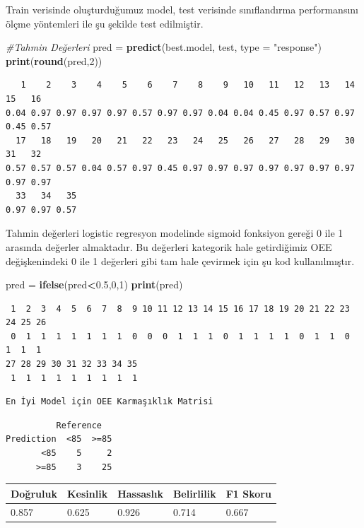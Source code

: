 \documentclass[12pt,twoside]{deuthesis}
\newenvironment{Shaded}{\begin{snugshade}}{\end{snugshade}}
\newcommand{\CommentTok}[1]{\textcolor[rgb]{0.56,0.35,0.01}{\textit{#1}}}
\newcommand{\DataTypeTok}[1]{\textcolor[rgb]{0.13,0.29,0.53}{#1}}
\newcommand{\DecValTok}[1]{\textcolor[rgb]{0.00,0.00,0.81}{#1}}
\newcommand{\FloatTok}[1]{\textcolor[rgb]{0.00,0.00,0.81}{#1}}
\newcommand{\KeywordTok}[1]{\textcolor[rgb]{0.13,0.29,0.53}{\textbf{#1}}}
\newcommand{\NormalTok}[1]{#1}
\newcommand{\OperatorTok}[1]{\textcolor[rgb]{0.81,0.36,0.00}{\textbf{#1}}}
\newcommand{\StringTok}[1]{\textcolor[rgb]{0.31,0.60,0.02}{#1}}
\begin{document}
Train verisinde oluşturduğumuz model, test verisinde sınıflandırma performansını ölçme yöntemleri ile şu şekilde test edilmiştir.
\begin{Shaded}
\begin{Highlighting}[]
\CommentTok{\#Tahmin Değerleri}
\NormalTok{pred =}\StringTok{ }\KeywordTok{predict}\NormalTok{(best.model, test, }\DataTypeTok{type =} \StringTok{"response"}\NormalTok{)}
\KeywordTok{print}\NormalTok{(}\KeywordTok{round}\NormalTok{(pred,}\DecValTok{2}\NormalTok{))}
\end{Highlighting}
\end{Shaded}
\begin{verbatim}
   1    2    3    4    5    6    7    8    9   10   11   12   13   14   15   16 
0.04 0.97 0.97 0.97 0.97 0.57 0.97 0.97 0.04 0.04 0.45 0.97 0.57 0.97 0.45 0.57 
  17   18   19   20   21   22   23   24   25   26   27   28   29   30   31   32 
0.57 0.57 0.57 0.04 0.57 0.97 0.45 0.97 0.97 0.97 0.97 0.97 0.97 0.97 0.97 0.97 
  33   34   35 
0.97 0.97 0.57 
\end{verbatim}
Tahmin değerleri logistic regresyon modelinde sigmoid fonksiyon gereği 0 ile 1 arasında değerler almaktadır. Bu değerleri kategorik hale getirdiğimiz OEE değişkenindeki 0 ile 1 değerleri gibi tam hale çevirmek için şu kod kullanılmıştır.
\begin{Shaded}
\begin{Highlighting}[]
\NormalTok{pred =}\StringTok{ }\KeywordTok{ifelse}\NormalTok{(pred}\OperatorTok{\textless{}}\FloatTok{0.5}\NormalTok{,}\DecValTok{0}\NormalTok{,}\DecValTok{1}\NormalTok{)}
\KeywordTok{print}\NormalTok{(pred)}
\end{Highlighting}
\end{Shaded}
\begin{verbatim}
 1  2  3  4  5  6  7  8  9 10 11 12 13 14 15 16 17 18 19 20 21 22 23 24 25 26 
 0  1  1  1  1  1  1  1  0  0  0  1  1  1  0  1  1  1  1  0  1  1  0  1  1  1 
27 28 29 30 31 32 33 34 35 
 1  1  1  1  1  1  1  1  1 
\end{verbatim}
\begin{verbatim}
En İyi Model için OEE Karmaşıklık Matrisi 
\end{verbatim}
\begin{verbatim}
          Reference
Prediction  <85  >=85
       <85    5     2
      >=85    3    25
\end{verbatim}
\begin{longtable}[]{@{}lllll@{}}
\toprule
Doğruluk & Kesinlik & Hassaslık & Belirlilik & F1 Skoru\tabularnewline
\midrule
\endhead
0.857 & 0.625 & 0.926 & 0.714 & 0.667\tabularnewline
\bottomrule
\end{longtable}
\end{document}
